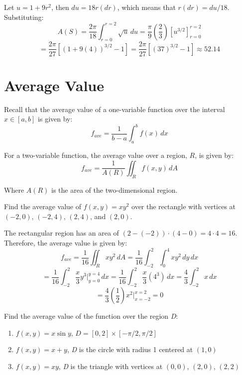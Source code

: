 \begin{Answer}[ref = surface]
\begin{enumerate}
Let $u = 1 + 9r^2$, then $du = 18r(dr)$, which means that $r(dr) = du/18$. 
Substituting:
$$A(S) = \frac{2\pi}{18} \int_{r = 0}^{r = 2} \sqrt{u}\,du = \frac{\pi}{9} 
\left( \frac{2}{3} \right) \left[ u^{3/2} \right]_{r = 0}^{r = 2}$$
$$= \frac{2\pi}{27} \left[ \left(1 + 9(4) \right)^{3/2} - 1 \right] = \frac{2
\pi}{27} \left[ \left(37 \right)^{3/2} - 1 \right] \approx 52.14$$
\end{enumerate}
\end{Answer}

\section{Average Value}
Recall that the average value of a one-variable function over the interval $x 
\in [a, b]$ is given by:
$$f_{ave} = \frac{1}{b - a}\int_a^b f(x)\,dx$$

For a two-variable function, the average value over a region, $R$, is given by:
$$f_{ave} = \frac{1}{A(R)} \iint_{R} f(x, y)\,dA$$

Where $A(R)$ is the area of the two-dimensional region. 

\begin{Worked}
\begin{Problem}
Find the average value of $f(x, y) = xy^2$ over the rectangle
with vertices at $(-2, 0)$, $(-2, 4)$, $(2, 4)$, and $(2, 0)$. 
\end{Problem}
\begin{Solution}
The rectangular region has an area of $(2 - (-2)) \cdot (4 -
0) = 4 \cdot 4 = 16$. Therefore, the average value is given by:
$$f_{ave} = \frac{1}{16} \iint_{R} xy^2\,dA = \frac{1}{16} \int_{-2}^2 \int_0^4
xy^2\,dy\,dx$$
$$= \frac{1}{16} \int_{-2}^2 \frac{x}{3} y^3|_{y = 0}^{y = 4}\,dx = \frac{1}{
16} \int_{-2}^2 \frac{x}{3} \left(4^3 \right)\,dx = \frac{4}{3} \int_{-2}^2 x\,
dx$$
$$= \frac{4}{3} \left( \frac{1}{2} \right) x^2|_{x = -2}^{x = 2} = 0$$
\end{Solution}
\end{Worked}

\begin{Exercise}[title = {Average Value}, label = avg]
Find the average value of the function over the region \textit{D}:
\begin{enumerate}
\item $f(x, y) = x\sin{y}$, $\textit{D} = [0, 2] \times [-\pi/2, \pi/2]$
\item $f(x, y) = x + y$, \textit{D} is the circle with radius 1 centered at 
$(1, 0)$
\item $f(x, y) = xy$, \textit{D} is the triangle with vertices at $(0, 0)$, 
$(2, 0)$, $(2, 2)$
\end{enumerate}
\vspace{70mm}
\end{Exercise}


